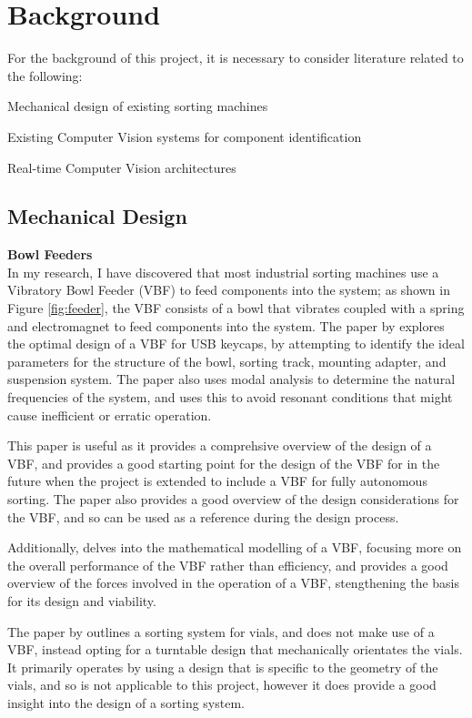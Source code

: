 \section{Background}
For the background of this project, it is necessary to consider literature related to the following:
\begin{mylist}
  \item Mechanical design of existing sorting machines
  \item Existing Computer Vision systems for component identification
  \item Real-time Computer Vision architectures
\end{mylist}
\subsection{Mechanical Design}
\noindent
\textbf{Bowl Feeders} \\
In my research, I have discovered that most industrial sorting machines use a Vibratory Bowl Feeder (VBF) to feed components into the system;
as shown in Figure \ref*{fig:feeder}, the VBF consists of a bowl that vibrates coupled with a spring and electromagnet to feed components into the system.
The paper by \citet{nam2019design} explores the optimal design of a VBF for USB keycaps, by attempting to identify the ideal parameters for the structure of the bowl,
sorting track, mounting adapter, and suspension system. The paper also uses modal analysis to determine the natural frequencies of the system, and uses this to
avoid resonant conditions that might cause inefficient or erratic operation.

This paper is useful as it provides a comprehsive overview of the design of a VBF, and provides a good starting point for the design of the VBF for in the future
when the project is extended to include a VBF for fully autonomous sorting. The paper also provides a good overview of the design considerations for the VBF, and so can be used as a reference
during the design process.

Additionally, \citet{REINHART2010191} delves into the mathematical modelling of a VBF, focusing more on the overall performance of the VBF rather than efficiency, and \citet{ForceAnalysisofVibratoryBowlFeeder}
provides a good overview of the forces involved in the operation of a VBF, stengthening the basis for its design and viability.

The paper by \citet{zhang2019design} outlines a sorting system for vials, and does not make use of a VBF, instead opting for a turntable design that mechanically orientates the vials. It primarily operates
by using a design that is specific to the geometry of the vials, and so is not applicable to this project, however it does provide a good insight into the design of a sorting system.

